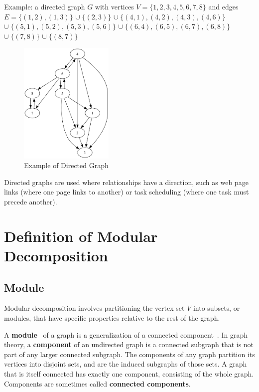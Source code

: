 Example: a directed graph $G$ with vertices $V = \{1, 2, 3, 4, 5, 6, 7, 8\}$ and edges \\
$E = \{(1, 2), (1, 3)\}$
$\cup \; \{(2, 3)\}$
$\cup \; \{(4 , 1), (4, 2), (4, 3), (4, 6)\}$
$\cup \; \{(5 , 1), (5, 2), (5, 3), (5, 6)\}$
$\cup \; \{(6, 4), (6, 5), (6, 7), (6, 8)\}$
$\cup \; \{(7, 8)\}$
$\cup \; \{(8, 7)\}$

\begin{figure}[!h]
    \centering
    \includegraphics[width=0.40\textwidth]{images/graphs/digraph_ex1_without_label}
    \caption{Example of Directed Graph}
    \label{fig:example-directed-graph}
\end{figure}

Directed graphs are used where relationships have a direction, such as web page links (where one page links to another) or task scheduling (where one task must precede another).


\section{Definition of Modular Decomposition}\label{sec:definition-of-modular-decomposition}

\subsection*{Module}\label{subsec:module}

Modular decomposition involves partitioning the vertex set $V$ into subsets, or modules, that have specific properties relative to the rest of the graph.

A \textbf{module}~\cite{mdwikipedia} of a graph is a generalization of a connected component~\cite{componentwikipedia}.
In graph theory, a \textbf{component} of an undirected graph is a connected subgraph that is not part of any larger connected subgraph.
The components of any graph partition its vertices into disjoint sets, and are the induced subgraphs of those sets.
A graph that is itself connected has exactly one component, consisting of the whole graph.
Components are sometimes called \textbf{connected components}.

